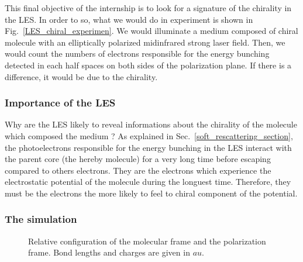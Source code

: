 \documentclass[a4paper]{article}
\begin{document}
This final objective of the internship is to look for a signature of the chirality in the LES. In order to so, what we would do in experiment is shown in Fig.~\ref{LES_chiral_experimen}. We would illuminate a medium composed of chiral molecule with an elliptically polarized midinfrared strong laser field. Then, we would count the numbers of electrons responsible for the energy bunching detected in each half spaces on both sides of the polarization plane. If there is a difference, it would be due to the chirality.

\subsubsection{Importance of the LES}

Why are the LES likely to reveal informations about the chirality of the molecule which composed the medium ?
As explained in Sec.~\ref{soft_rescattering_section}, the photoelectrons responsible for the energy bunching in the LES interact with the parent core (the hereby molecule) for a very long time before escaping compared to others electrons. They are the electrons which experience the electrostatic potential of the molecule during the longuest time. Therefore, they must be the electrons the more likely to feel to chiral component of the potential.

\subsubsection{The simulation}

\begin{figure}[htp]
\vspace{-3cm}
\resizebox{1\textwidth}{!}{}
\caption{Relative configuration of the molecular frame and the polarization frame. Bond lengths and charges are given in $au$.}
\label{frames_molecular_laboratory}
\end{figure}
\end{document}
